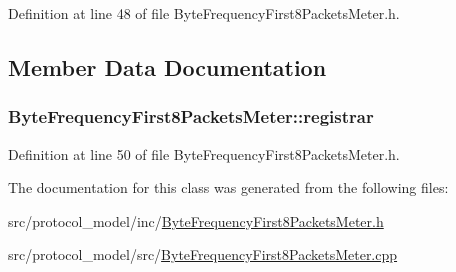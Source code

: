 Definition at line 48 of file Byte\-Frequency\-First8\-Packets\-Meter.\-h.



\subsection{Member Data Documentation}
\hypertarget{class_vsid_1_1_byte_frequency_first8_packets_meter_a1f57fc0af2e1700109db9e2d12e63745}{
\subsubsection[{registrar}]{ Byte\-Frequency\-First8\-Packets\-Meter\-::registrar\hspace{0.3cm}{\ttfamily [static]}}}\label{class_vsid_1_1_byte_frequency_first8_packets_meter_a1f57fc0af2e1700109db9e2d12e63745}


Definition at line 50 of file Byte\-Frequency\-First8\-Packets\-Meter.\-h.



The documentation for this class was generated from the following files\-:\begin{DoxyCompactItemize}
\item 
src/protocol\-\_\-model/inc/\hyperlink{_byte_frequency_first8_packets_meter_8h}{Byte\-Frequency\-First8\-Packets\-Meter.\-h}\item 
src/protocol\-\_\-model/src/\hyperlink{_byte_frequency_first8_packets_meter_8cpp}{Byte\-Frequency\-First8\-Packets\-Meter.\-cpp}\end{DoxyCompactItemize}
